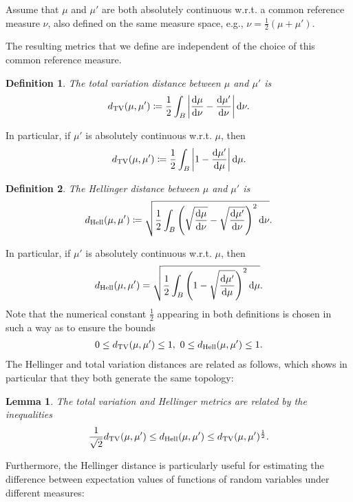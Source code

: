 \documentclass[oneside,11pt]{book}
\numberwithin{equation}{section}
\newtheorem{lemma}{Lemma}[section]
\newtheorem{definition}{Definition}[section]
\begin{document}
Assume that $\mu$ and $\mu'$ are both absolutely continuous w.r.t. a common reference measure $\nu$, also defined on the same measure space, e.g., $\nu = \frac{1}{2}(\mu + \mu')$.

The resulting metrics that we define are independent of the choice of this common reference measure.

\begin{definition}
    The \emph{total variation distance} between $\mu$ and $\mu'$ is
    \begin{align*}
        d_{\rm TV}(\mu,\mu')\coloneqq\frac{1}{2}\int_B \left|\frac{{\rm d}\mu}{{\rm d}\nu} - \frac{{\rm d}\mu'}{{\rm d}\nu}\right|{\rm d}\nu.
    \end{align*}
\end{definition}
In particular, if $\mu'$ is absolutely continuous w.r.t. $\mu$, then
\begin{align*}
    d_{\rm TV}(\mu,\mu')\coloneqq\frac{1}{2}\int_B \left|1 - \frac{{\rm d}\mu'}{{\rm d}\mu}\right|{\rm d}\mu.
\end{align*}

\begin{definition}
    The \emph{Hellinger distance} between $\mu$ and $\mu'$ is
    \begin{align*}
        d_{\rm Hell}(\mu,\mu')\coloneqq\sqrt{\frac{1}{2}\int_B \left(\sqrt{\frac{{\rm d}\mu}{{\rm d}\nu}} - \sqrt{\frac{{\rm d}\mu'}{{\rm d}\nu}}\right)^2{\rm d}\nu}.
    \end{align*}
\end{definition}
In particular, if $\mu'$ is absolutely continuous w.r.t. $\mu$, then
\begin{align*}
    d_{\rm Hell}(\mu,\mu') = \sqrt{\frac{1}{2}\int_B \left(1 - \sqrt{\frac{{\rm d}\mu'}{{\rm d}\mu}}\right)^2{\rm d}\mu}.
\end{align*}
Note that the numerical constant $\frac{1}{2}$ appearing in both definitions is chosen in such a way as to ensure the bounds
\begin{align*}
    0\le d_{\rm TV}(\mu,\mu')\le 1,\ 0\le d_{\rm Hell}(\mu,\mu')\le 1.
\end{align*}
The Hellinger and total variation distances are related as follows, which shows in particular that they both generate the same topology:

\begin{lemma}
    The total variation and Hellinger metrics are related by the inequalities
    \begin{align*}
        \frac{1}{\sqrt{2}}d_{\rm TV}(\mu,\mu')\le d_{\rm Hell}(\mu,\mu')\le d_{\rm TV}(\mu,\mu')^{\frac{1}{2}}.
    \end{align*}
\end{lemma}
Furthermore, the Hellinger distance is particularly useful for estimating the difference between expectation values of functions of random variables under different measures:
\end{document}
